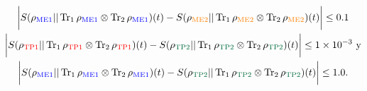 \documentclass{report} %
\numberwithin{equation}{section}
\begin{document}
\begin{gather*}
     \bigg|S(\rho_{\textnormal{\textcolor{blue}{ME1}}}|| \Tr_{1}\rho_{\textnormal{\textcolor{blue}{ME1}}} \otimes \Tr_{2}\rho_{\textnormal{\textcolor{blue}{ME1}}})(t) - S(\rho_{\textnormal{\textcolor{orange}{ME2}}}|| \Tr_{1}\rho_{\textnormal{\textcolor{orange}{ME2}}} \otimes \Tr_{2}\rho_{\textnormal{\textcolor{orange}{ME2}}})(t)  \bigg|  \leq 0.1 \\
     \bigg|  S(\rho_{\textnormal{\textcolor{red}{TP1}}}|| \Tr_{1}\rho_{\textnormal{\textcolor{red}{TP1}}} \otimes \Tr_{2}\rho_{\textnormal{\textcolor{red}{TP1}}})(t) -
     S(\rho_{\textnormal{\textcolor{dark green}{TP2}}}|| \Tr_{1}\rho_{\textnormal{\textcolor{dark green}{TP2}}} \otimes \Tr_{2}\rho_{\textnormal{\textcolor{dark green}{TP2}}})(t) \bigg|  \leq 1 \times10^{-3} \textnormal{ y} \\ \bigg|S(\rho_{\textnormal{\textcolor{blue}{ME1}}}|| \Tr_{1}\rho_{\textnormal{\textcolor{blue}{ME1}}} \otimes \Tr_{2}\rho_{\textnormal{\textcolor{blue}{ME1}}})(t) -
     S(\rho_{\textnormal{\textcolor{dark green}{TP2}}}|| \Tr_{1}\rho_{\textnormal{\textcolor{dark green}{TP2}}} \otimes \Tr_{2}\rho_{\textnormal{\textcolor{dark green}{TP2}}})(t) \bigg| \leq 1.0.
\end{gather*}
\end{document}
